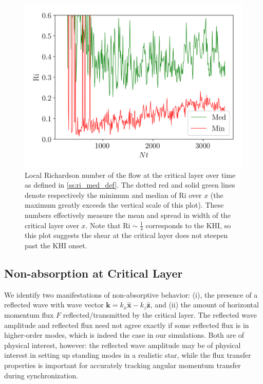 \documentclass[
        fleqn,
        usenatbib,
    ]{mnras}
\newcommand*{\bm}[1]{\mathbf{#1}}
\newcommand*{\uv}[1]{\hat{\mathbf{#1}}}
\begin{document}
\begin{figure}
    \centering
    \includegraphics[width=\columnwidth]{plots/nl_f_ri.png}
    \caption{Local Richardson number of the flow at the critical layer over time
    as defined in \autoref{ss:ri_med_def}. The dotted red and solid green lines
    denote respectively the minimum and median of $\mathrm{Ri}$ over $x$ (the
    maximum greatly exceeds the vertical scale of this plot). These numbers
    effectively measure the mean and spread in width of the critical layer over
    $x$. Note that $\mathrm{Ri} \sim \frac{1}{4}$ corresponds to the KHI, so
    this plot suggests the shear at the critical layer does not steepen past the
    KHI onset.}\label{fig:nl_f_ri}
\end{figure}

\subsection{Non-absorption at Critical Layer}\label{ss:reflectivity}

We identify two manifestations of non-absorptive behavior: (i), the presence of
a reflected wave with wave vector $\bm{k} = k_{x}\uv{x} - k_{z}\uv{z}$, and (ii)
the amount of horizontal momentum flux $F$ reflected/transmitted by the critical
layer. The reflected wave amplitude and reflected flux need not agree exactly if
some reflected flux is in higher-order modes, which is indeed the case in our
simulations. Both are of physical interest, however: the reflected wave
amplitude may be of physical interest in setting up standing modes in a
realistic star, while the flux transfer properties is important for accurately
tracking angular momentum transfer during synchronization.
\end{document}

